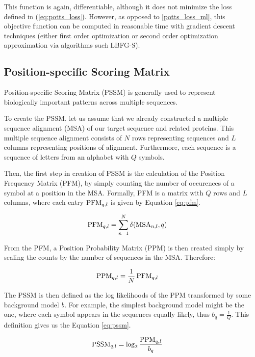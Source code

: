 This function is again, differentiable, although it does not minimize the loss defined in (\ref{eq:potts_loss}).
However, as opposed to \ref{potts_loss_ml}, this objective function can be computed in reasonable time with gradient descent techniques (either first order optimization or second order optimization approximation via algorithms such LBFG-S)\cite{potts1, potts2}.
        
\subsection{Position-specific Scoring Matrix}

Position-specific Scoring Matrix (PSSM) is generally used to represent biologically important patterns across multiple sequences. 

To create the PSSM, let us assume that we already constructed a multiple sequence alignment (MSA) of our target sequence and related proteins.
This multiple sequence alignment consists of $N$ rows representing sequences and $L$ columns representing positions of alignment.
Furthermore, each sequence is a sequence of letters from an alphabet with $Q$ symbols.

Then, the first step in creation of PSSM is the calculation of the Position Frequency Matrix (PFM), by simply counting the number of occurences of a symbol at a position in the MSA.
Formally, PFM is a matrix with $Q$ rows and $L$ columns, where each entry $\operatorname{PFM}_{q, l}$ is given by Equation \ref{eq:pfm}.

\begin{equation}
    \operatorname{PFM}_{q, l} = \sum_{n = 1}^{N} \delta(\operatorname{MSA}_{n, l}, q)
    \label{eq:pfm}
\end{equation}

From the PFM, a Position Probability Matrix (PPM) is then created simply by scaling the counts by the number of sequences in the MSA.
Therefore:

\begin{equation}
    \operatorname{PPM}_{q, l} = \frac{1}{N} \operatorname{PFM}_{q, l}
\end{equation}

The PSSM is then defined as the log likelihoods of the PPM transformed by some background model $b$.
For example, the simplest background model might be the one, where each symbol appears in the sequences equally likely, thus $b_q = \frac{1}{Q}$.
This definition gives us the Equation \ref{eq:pssm}.

\begin{equation}
    \operatorname{PSSM}_{q, l} = \log_2 \frac{\operatorname{PPM}_{q, l}}{b_q}
    \label{eq:pssm}
\end{equation}

